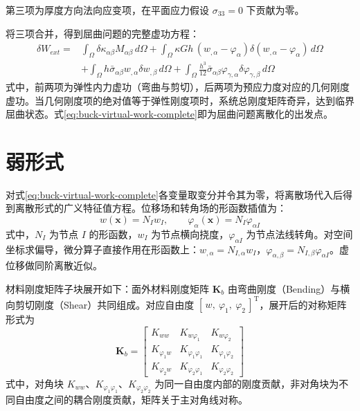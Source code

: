 第三项为厚度方向法向应变项，在平面应力假设 $\sigma_{33}=0$ 下贡献为零。

将三项合并，得到屈曲问题的完整虚功方程：
\begin{equation}
\begin{aligned}
\delta W_{ext} ={}& \int_\Omega \delta\kappa_{\alpha\beta}M_{\alpha\beta}\, d\Omega + \int_\Omega \kappa G h\,(w_{,\alpha} - \varphi_\alpha)\delta(w_{,\alpha} - \varphi_\alpha)\, d\Omega \\
&+ \int_\Omega h\bar{\sigma}_{\alpha\beta} w_{,\alpha}\delta w_{,\beta}\, d\Omega + \int_\Omega \frac{h^3}{12}\bar{\sigma}_{\alpha\beta} \varphi_{\gamma,\alpha}\delta\varphi_{\gamma,\beta}\, d\Omega
\end{aligned}
\label{eq:buck-virtual-work-complete}
\end{equation}
式中，前两项为弹性内力虚功（弯曲与剪切），后两项为预应力度对应的几何刚度虚功。当几何刚度项的绝对值等于弹性刚度项时，系统总刚度矩阵奇异，达到临界屈曲状态。式\eqref{eq:buck-virtual-work-complete}即为屈曲问题离散化的出发点。

\section{弱形式}

对式\eqref{eq:buck-virtual-work-complete}各变量取变分并令其为零，将离散场代入后得到离散形式的广义特征值方程。位移场和转角场的形函数插值为：
\begin{equation}
w(\mathbf{x}) = N_I w_I, \qquad \varphi_\alpha(\mathbf{x}) = N_I \varphi_{\alpha I}
\label{eq:buck-shape-function-interpolation}
\end{equation}
式中，$N_I$ 为节点 $I$ 的形函数，$w_I$ 为节点横向挠度，$\varphi_{\alpha I}$ 为节点法线转角。对空间坐标求偏导，微分算子直接作用在形函数上：$w_{,\alpha} = N_{I,\alpha}w_I$，$\varphi_{\alpha,\beta} = N_{I,\beta}\varphi_{\alpha I}$。虚位移做同阶离散近似。

材料刚度矩阵子块展开如下：面外材料刚度矩阵 $\mathbf{K}_b$ 由弯曲刚度（Bending）与横向剪切刚度（Shear）共同组成。对应自由度 $[\,w,\ \varphi_1,\ \varphi_2\,]^{\mathrm{T}}$，展开后的对称矩阵形式为
\begin{equation}
\mathbf{K}_b = \begin{bmatrix}
K_{ww} & K_{w\varphi_1} & K_{w\varphi_2} \\
K_{\varphi_1 w} & K_{\varphi_1\varphi_1} & K_{\varphi_1\varphi_2} \\
K_{\varphi_2 w} & K_{\varphi_2\varphi_1} & K_{\varphi_2\varphi_2}
\end{bmatrix}
\label{eq:kb-matrix}
\end{equation}
式中，对角块 $K_{ww}$、$K_{\varphi_1\varphi_1}$、$K_{\varphi_2\varphi_2}$ 为同一自由度内部的刚度贡献，非对角块为不同自由度之间的耦合刚度贡献，矩阵关于主对角线对称。

